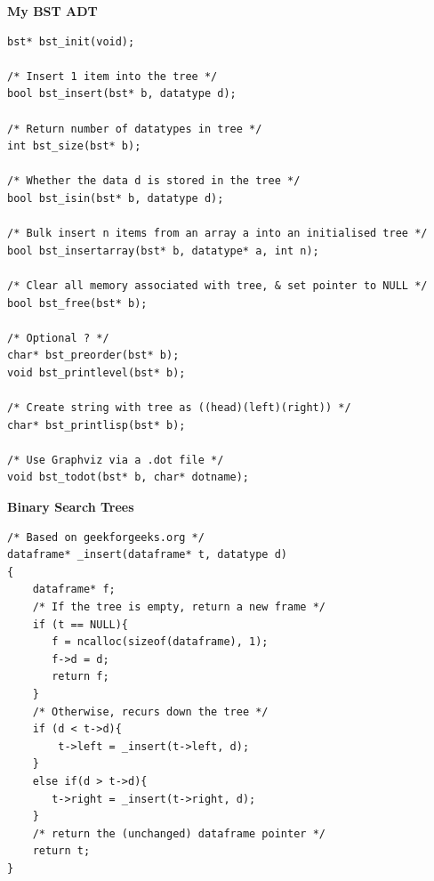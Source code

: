 \documentclass[a4,portraitt]{slides}
\begin{document}
\newpage
{\samepage
\begin{center}
{\Large{\bf My BST ADT}}
\end{center}
{\small
\begin{verbatim}
bst* bst_init(void);

/* Insert 1 item into the tree */
bool bst_insert(bst* b, datatype d);

/* Return number of datatypes in tree */
int bst_size(bst* b);

/* Whether the data d is stored in the tree */
bool bst_isin(bst* b, datatype d);

/* Bulk insert n items from an array a into an initialised tree */
bool bst_insertarray(bst* b, datatype* a, int n);

/* Clear all memory associated with tree, & set pointer to NULL */
bool bst_free(bst* b);

/* Optional ? */
char* bst_preorder(bst* b);
void bst_printlevel(bst* b);

/* Create string with tree as ((head)(left)(right)) */
char* bst_printlisp(bst* b);

/* Use Graphviz via a .dot file */
void bst_todot(bst* b, char* dotname);
\end{verbatim}
}}

\newpage
{\samepage
\begin{center}
{\Large{\bf Binary Search Trees}}
\end{center}
\begin{verbatim}
/* Based on geekforgeeks.org */
dataframe* _insert(dataframe* t, datatype d)
{
    dataframe* f;
    /* If the tree is empty, return a new frame */
    if (t == NULL){
       f = ncalloc(sizeof(dataframe), 1);
       f->d = d;
       return f;
    }
    /* Otherwise, recurs down the tree */
    if (d < t->d){
        t->left = _insert(t->left, d);
    }
    else if(d > t->d){
       t->right = _insert(t->right, d);
    }
    /* return the (unchanged) dataframe pointer */
    return t;
}
\end{verbatim}
}
\end{document}
